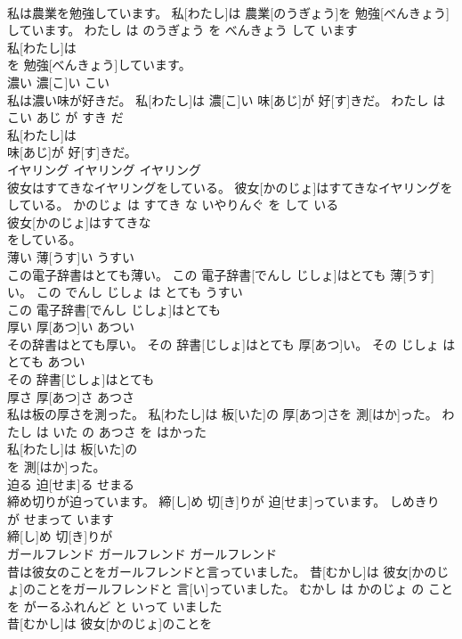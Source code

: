 \documentclass[8pt]{extreport}
\begin{document}
\begin{CJK}{UTF8}{min}
\\	私は農業を勉強しています。	私[わたし]は 農業[のうぎょう]を 勉強[べんきょう]しています。	わたし は のうぎょう を べんきょう して います	
\\	私[わたし]は
\\	を 勉強[べんきょう]しています。			
\\	濃い	濃[こ]い	こい	
\\	私は濃い味が好きだ。	私[わたし]は 濃[こ]い 味[あじ]が 好[す]きだ。	わたし は こい あじ が すき だ	
\\	私[わたし]は
\\	味[あじ]が 好[す]きだ。			
\\	イヤリング	イヤリング	イヤリング	
\\	彼女はすてきなイヤリングをしている。	彼女[かのじょ]はすてきなイヤリングをしている。	かのじょ は すてき な いやりんぐ を して いる	
\\	彼女[かのじょ]はすてきな
\\	をしている。			
\\	薄い	薄[うす]い	うすい	
\\	この電子辞書はとても薄い。	この 電子辞書[でんし じしょ]はとても 薄[うす]い。	この でんし じしょ は とても うすい	
\\	この 電子辞書[でんし じしょ]はとても
\\	厚い	厚[あつ]い	あつい	
\\	その辞書はとても厚い。	その 辞書[じしょ]はとても 厚[あつ]い。	その じしょ は とても あつい	
\\	その 辞書[じしょ]はとても
\\	厚さ	厚[あつ]さ	あつさ	
\\	私は板の厚さを測った。	私[わたし]は 板[いた]の 厚[あつ]さを 測[はか]った。	わたし は いた の あつさ を はかった	
\\	私[わたし]は 板[いた]の
\\	を 測[はか]った。			
\\	迫る	迫[せま]る	せまる	
\\	締め切りが迫っています。	締[し]め 切[き]りが 迫[せま]っています。	しめきり が せまって います	
\\	締[し]め 切[き]りが
\\	ガールフレンド	ガールフレンド	ガールフレンド	
\\	昔は彼女のことをガールフレンドと言っていました。	昔[むかし]は 彼女[かのじょ]のことをガールフレンドと 言[い]っていました。	むかし は かのじょ の こと を がーるふれんど と いって いました	
\\	昔[むかし]は 彼女[かのじょ]のことを

\end{CJK}
\end{document}
